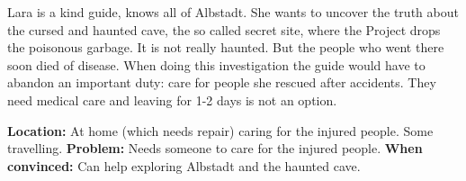 \begin{npcBox}[title=Lara]
    \begin{consequences}
    \item {}
    \item {}
    \item {}
    \end{consequences}

    \begin{npcDescription}
    Lara is a kind guide, knows all of Albstadt. She wants to uncover the truth about the cursed and haunted cave, the so called secret site, where the Project drops the poisonous garbage. It is not really haunted. But the people who went there soon died of disease.
    When doing this investigation the guide would have to abandon an important duty: care for people she rescued after accidents. They need medical care and leaving for 1-2 days is not an option.

    \textbf{Location:} At home (which needs repair) caring for the injured people. Some travelling.
    \textbf{Problem:} Needs someone to care for the injured people.
    \textbf{When convinced:} Can help exploring Albstadt and the haunted cave.
    \end{npcDescription}

\end{npcBox}

\newpage

